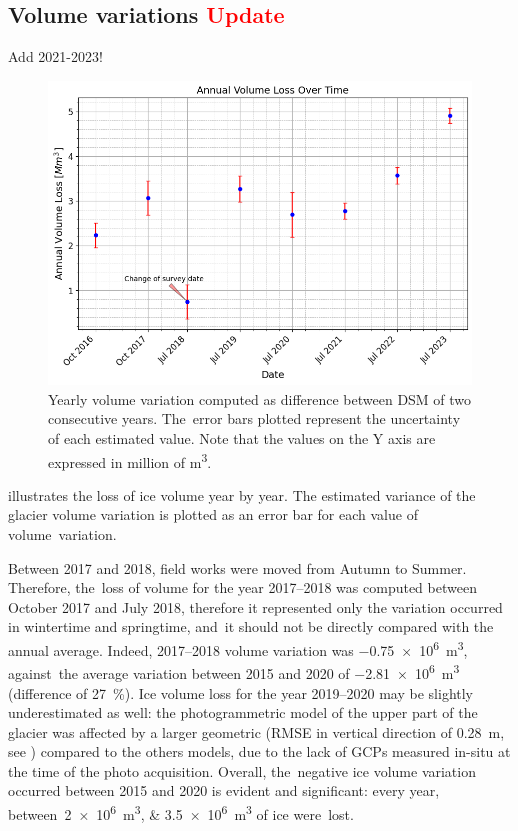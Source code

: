 \subsection{Volume variations \textcolor{red}{Update}}\label{sec:3:res:volumes}

{\color{red} Add 2021-2023!}

\begin{figure}
    \centering
    \includegraphics[width=0.8\columnwidth]{volume_loss_2015-2023.png}
    \caption{Yearly volume variation computed as difference between DSM of two
        consecutive years. The~error bars plotted represent the uncertainty of each
        estimated value. Note that the values on the Y axis are expressed in million of
        \si{\cubic\meter}.}
    \label{fig:3:volumes}
\end{figure}

 illustrates the loss of ice volume year by year.
The estimated variance of the glacier volume variation is plotted as an error bar for
each value of volume~variation.

Between 2017 and 2018, field works were moved from Autumn to Summer.
Therefore, the~loss of volume for the year 2017--2018 was computed between October 2017
and July 2018, therefore it represented only the variation occurred in wintertime and
springtime, and~it should not be directly compared with the annual average.
Indeed, 2017--2018 volume variation was \SI{-0.75e6}{\cubic\meter}, against~the average
variation between 2015 and 2020 of \SI{-2.81e6}{\cubic\meter} (difference of
\SI{27}{\percent}).
Ice volume loss for the year 2019--2020 may be slightly underestimated as well: the
photogrammetric model of the upper part of the glacier was affected by a larger geometric
(RMSE in vertical direction of \SI{0.28}{\meter}, see )
compared to the others models, due to the lack of GCPs measured in-situ at the time of
the photo acquisition.
Overall, the~negative ice volume variation occurred between 2015 and 2020 is evident and
significant: every year, between~\SIlist{2e6;3.5e6}{\cubic\meter} of ice were~lost.

